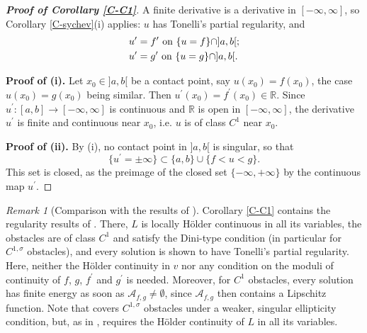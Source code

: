 \documentclass[reqno,12pt]{amsart}
\numberwithin{equation}{section}
\def\RR{{\mathds R}}
\def\A{\mathcal{A}_{f,g}}
\theoremstyle{remark}
\newtheorem{remark}[theorem]{Remark}
\begin{document}
\begin{proof}[\bf Proof of Corollary \ref{C-C1}]
A finite derivative is a derivative in $[-\infty,\infty]$, so Corollary \ref{C-sychev}(i) applies: $u$ has Tonelli's partial regularity, and
\begin{align*}
&u^\prime=f^\prime\hbox{ on }\{u=f\}\cap]a,b[;\\
&u^\prime=g^\prime\hbox{ on }\{u=g\}\cap]a,b[.
\end{align*}

\medskip

{\bf Proof of (i).} Let $x_0\in]a,b[$ be a contact point, say $u(x_0)=f(x_0)$, the case $u(x_0)=g(x_0)$ being similar. Then $u^\prime(x_0)=f^\prime(x_0)\in\RR$. Since $u^\prime:[a,b]\to[-\infty,\infty]$ is continuous and $\RR$ is open in $[-\infty,\infty]$, the derivative $u^\prime$ is finite and continuous near $x_0$, i.e. $u$ is of class $C^1$ near $x_0$.

\medskip

{\bf Proof of (ii).} By (i), no contact point in $]a,b[$ is singular, so that
\begin{equation*}
\{u^\prime=\pm\infty\}\subset\{a,b\}\cup\{f<u<g\}.
\end{equation*}
This set is closed, as the preimage of the closed set $\{-\infty,+\infty\}$ by the continuous map $u^\prime$.
\end{proof}

\begin{remark}[Comparison with the results of \cite{mandallena18}]\label{Remark-Man18}
Corollary \ref{C-C1} contains the regularity results of \cite[Theorem 2.8 and Corollary 2.9]{mandallena18}. There, $L$ is locally H\"older continuous in all its variables, the obstacles are of class $C^1$ and satisfy the Dini-type condition \cite[(1.2)]{mandallena18} (in particular for $C^{1,\sigma}$ obstacles), and every solution is shown to have Tonelli's partial regularity. Here, neither the H\"older continuity in $v$ nor any condition on the moduli of continuity of $f$, $g$, $f^\prime$ and $g^\prime$ is needed. Moreover, for $C^1$ obstacles, every solution has finite energy as soon as $\A\neq\emptyset$, since $\A$ then contains a Lipschitz function. Note that \cite[Theorem 1.2]{gratwick-sychev19} covers $C^{1,\sigma}$ obstacles under a weaker, singular ellipticity condition, but, as in \cite{mandallena18}, requires the H\"older continuity of $L$ in all its variables.
\end{remark}
\end{document}
